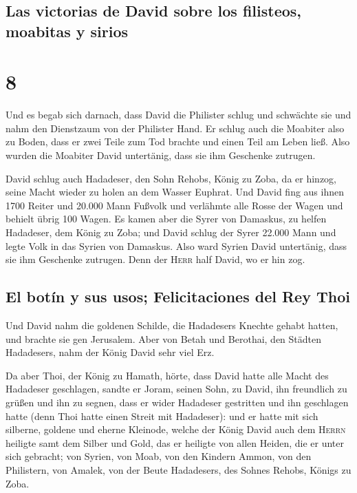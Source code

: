 \hypertarget{las-victorias-de-david-sobre-los-filisteos-moabitas-y-sirios}{%
\subsection{Las victorias de David sobre los filisteos, moabitas y
sirios}\label{las-victorias-de-david-sobre-los-filisteos-moabitas-y-sirios}}

\hypertarget{section-7}{%
\section{8}\label{section-7}}

 Und es begab sich darnach, dass David die Philister
schlug und schwächte sie und nahm den Dienstzaum von der Philister Hand.
 Er schlug auch die Moabiter also zu Boden, dass er zwei
Teile zum Tod brachte und einen Teil am Leben ließ. Also wurden die
Moabiter David untertänig, dass sie ihm Geschenke zutrugen.

 David schlug auch Hadadeser, den Sohn Rehobs, König zu
Zoba, da er hinzog, seine Macht wieder zu holen an dem Wasser Euphrat.
 Und David fing aus ihnen 1700 Reiter und 20.000 Mann
Fußvolk und verlähmte alle Rosse der Wagen und behielt übrig 100 Wagen.
 Es kamen aber die Syrer von Damaskus, zu helfen
Hadadeser, dem König zu Zoba; und David schlug der Syrer 22.000 Mann
 und legte Volk in das Syrien von Damaskus. Also ward
Syrien David untertänig, dass sie ihm Geschenke zutrugen. Denn der
\textsc{Herr} half David, wo er hin zog.

\hypertarget{el-botuxedn-y-sus-usos-felicitaciones-del-rey-thoi}{%
\subsection{El botín y sus usos; Felicitaciones del Rey
Thoi}\label{el-botuxedn-y-sus-usos-felicitaciones-del-rey-thoi}}

 Und David nahm die goldenen Schilde, die Hadadesers
Knechte gehabt hatten, und brachte sie gen Jerusalem. 
Aber von Betah und Berothai, den Städten Hadadesers, nahm der König
David sehr viel Erz.

 Da aber Thoi, der König zu Hamath, hörte, dass David
hatte alle Macht des Hadadeser geschlagen,  sandte er
Joram, seinen Sohn, zu David, ihn freundlich zu grüßen und ihn zu
segnen, dass er wider Hadadeser gestritten und ihn geschlagen hatte
(denn Thoi hatte einen Streit mit Hadadeser): und er hatte mit sich
silberne, goldene und eherne Kleinode,  welche der König
David auch dem \textsc{Herrn} heiligte samt dem Silber und Gold, das er
heiligte von allen Heiden, die er unter sich gebracht; 
von Syrien, von Moab, von den Kindern Ammon, von den Philistern, von
Amalek, von der Beute Hadadesers, des Sohnes Rehobs, Königs zu Zoba.

